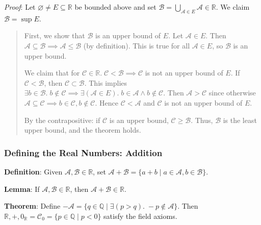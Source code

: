 \documentclass[11pt]{article}
\begin{document}
\emph{Proof}: Let $\varnothing \neq E \subseteq \mathbb{R}$ be bounded above and set $\mathcal{B} = \bigcup_{\mathcal{A} \in E} \mathcal{A} \in \mathbb{R}$. We claim $\mathcal{B} = \sup E$.
\begin{quote}\vspace{-0.3cm}
First, we show that $\mathcal{B}$ is an upper bound of $E$. Let $\mathcal{A} \in E$. Then $\mathcal{A} \subseteq \mathcal{B} \implies \mathcal{A} \leq \mathcal{B}$ (by definition). This is true for all $\mathcal{A} \in E$, so $\mathcal{B}$ is an upper bound.

We claim that for $\mathcal{C} \in \mathbb{R}.\; \mathcal{C} < \mathcal{B} \implies \mathcal{C}$ is not an upper bound of $E$. If $\mathcal{C} < \mathcal{B}$, then $\mathcal{C} \subset \mathcal{B}$. This implies $\exists b \in \mathcal{B}.\; b \notin \mathcal{C} \implies \exists(\mathcal{A} \in E).\; b \in \mathcal{A} \land b \notin \mathcal{C}$. Then $\mathcal{A} > \mathcal{C}$ since otherwise $\mathcal{A} \subseteq \mathcal{C} \implies b \in \mathcal{C}, b \notin \mathcal{C}$. Hence $\mathcal{C} < \mathcal{A}$ and $\mathcal{C}$ is not an upper bound of $E$.

By the contrapositive: if $\mathcal{C}$ is an upper bound, $\mathcal{C} \geq \mathcal{B}$. Thus, $\mathcal{B}$ is the least upper bound, and the theorem holds.
\end{quote}

\subsubsection{Defining the Real Numbers: Addition}

\textbf{Definition}: Given $\mathcal{A}, \mathcal{B} \in \mathbb{R}$, set $\mathcal{A} + \mathcal{B} = \{a+b \;|\; a \in \mathcal{A}, b \in \mathcal{B}\}$.

\textbf{Lemma}: If $\mathcal{A}, \mathcal{B} \in \mathbb{R}$, then $\mathcal{A} + \mathcal{B} \in \mathbb{R}$.

\textbf{Theorem}: Define $-\mathcal{A} = \{q \in \mathbb{Q} \;|\; \exists(p >q).\; -p \notin \mathcal{A}\}$. Then $\mathbb{R}, +, 0_\mathbb{R} = \mathcal{C}_0 = \{p \in \mathbb{Q} \;|\; p < 0\}$ satisfy the field axioms.
\end{document}
